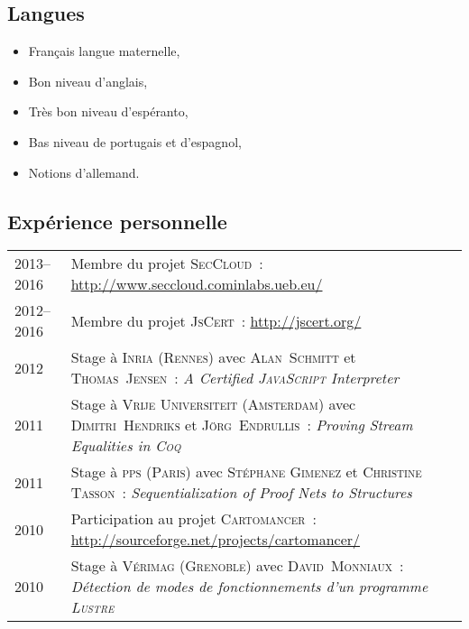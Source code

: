 \documentclass[12pt,a4paper]{article}
\makeatletter
\newcommand{\en}[1]{\foreignlanguage{english}{\textit{#1}}}
\newenvironment{datecvsection}[1]%
               {\subsection*{#1}%
                 \noindent \begin{tabular}{@{}p{\annee}p{\texte}@{}}}
               {\end{tabular}}
\newenvironment{itemcvsection}[1]%
               {\subsection*{#1}\begin{itemize}}
               {\end{itemize}}
\makeatother
\begin{document}
\begin{itemcvsection}{Langues}

   \item Français langue maternelle,
   \item Bon niveau d’anglais,
   \item Très bon niveau d’espéranto,
   \item Bas niveau de portugais et d’espagnol,
   \item Notions d’allemand.

\end{itemcvsection}

\begin{datecvsection}{Expérience personnelle}

	2013–2016 & Membre du projet \textsc{SecCloud}~:  \url{http://www.seccloud.cominlabs.ueb.eu/} \\

	2012–2016 & Membre du projet \textsc{JsCert}~:  \url{http://jscert.org/} \\

	2012 & Stage à \textsc{Inria} (\textsc{Rennes}) avec \textsc{Alan~Schmitt} et \textsc{Thomas~Jensen}~:
	\en{\textit{A Certified \textsc{JavaScript} Interpreter}} \\

	2011 & Stage à \textsc{Vrĳe Universiteit} (\textsc{Amsterdam}) avec \textsc{Dimitri~Hendriks} et \textsc{Jörg~Endrullis}~:
	\en{\textit{Proving Stream Equalities in \textsc{Coq}}} \\

	2011 & Stage à \textsc{pps} (\textsc{Paris}) avec \textsc{Stéphane Gimenez} et \textsc{Christine Tasson}~:
	\en{\textit{Sequentialization of Proof Nets to Structures}} \\

	2010 & Participation au projet \textsc{Cartomancer}~:  \url{http://sourceforge.net/projects/cartomancer/} \\

	2010 & Stage à \textsc{Vérimag} (\textsc{Grenoble}) avec \textsc{David~Monniaux}~:
	\textit{Détection de modes de fonctionnements d’un programme \textsc{Lustre}} \\

\end{datecvsection}
\end{document}
